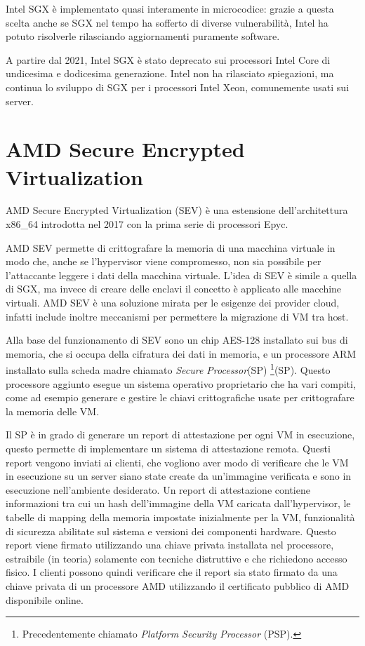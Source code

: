 \documentclass[12pt,italian]{report}
\begin{document}
\medbreak \noindent

Intel SGX è implementato quasi interamente in microcodice: 
grazie a questa scelta anche se SGX nel tempo ha sofferto
di diverse vulnerabilità, Intel ha potuto risolverle rilasciando
aggiornamenti puramente software.

A partire dal 2021, Intel SGX è stato deprecato sui processori Intel Core
di undicesima e dodicesima generazione\cite{sgx_deprecation}.
Intel non ha rilasciato spiegazioni, ma continua lo sviluppo di SGX per
i processori Intel Xeon, comunemente usati sui server. 

\section{AMD Secure Encrypted Virtualization}
\label{sec:amd-sev}
AMD Secure Encrypted Virtualization (SEV) è una estensione dell'architettura
x86\_64 introdotta nel 2017\cite{sev} con la prima serie
di processori Epyc.

AMD SEV permette di crittografare la memoria di una macchina virtuale in
modo che, anche se l'hypervisor viene compromesso, non sia possibile per
l'attaccante leggere i dati della macchina virtuale.
L'idea di SEV è simile a quella di SGX, ma invece di creare delle enclavi
il concetto è applicato alle macchine virtuali.
AMD SEV è una soluzione mirata per le esigenze dei provider cloud,
infatti include inoltre meccanismi per permettere la migrazione di VM
tra host.

Alla base del funzionamento di SEV sono un chip AES-128 installato sui
bus di memoria, che si occupa della cifratura dei dati in memoria,
e un processore ARM installato sulla scheda madre chiamato 
\textit{Secure Processor}(SP)
\footnote{
    Precedentemente chiamato \textit{Platform Security Processor} (PSP).
}(SP).
Questo processore aggiunto esegue un sistema operativo proprietario che
ha vari compiti, come ad esempio generare e gestire le chiavi crittografiche
usate per crittografare la memoria delle VM.

Il SP è in grado di generare un report di attestazione per ogni VM
in esecuzione, questo permette di implementare un sistema di
attestazione remota.
Questi report vengono inviati ai clienti, che vogliono aver modo di
verificare che le VM in esecuzione su un server siano state create
da un'immagine verificata e sono in esecuzione nell'ambiente desiderato.
Un report di attestazione contiene informazioni tra cui un hash dell'immagine
della VM caricata dall'hypervisor, le tabelle di mapping della memoria
impostate inizialmente per la VM, funzionalità di sicurezza abilitate
sul sistema e versioni dei componenti hardware.
Questo report viene firmato utilizzando una chiave privata installata nel
processore, estraibile (in teoria) solamente con tecniche distruttive e
che richiedono accesso fisico.
I clienti possono quindi verificare che il report sia stato firmato da
una chiave privata di un processore AMD utilizzando il certificato pubblico
di AMD disponibile online. 
\end{document}
